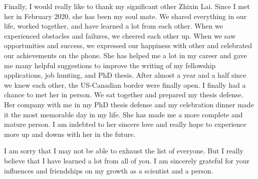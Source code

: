 Finally, I would really like to thank my significant other Zhixin Lai. Since I met her in February 2020, she has been my soul mate. We shared everything in our life, worked together, and have learned a lot from each other. When we experienced obstacles and failures, we cheered each other up. When we saw opportunities and success, we expressed our happiness with other and celebrated our achievements on the phone. She has helped me a lot in my career and gave me many helpful suggestions to improve the writing of my fellowship applications, job hunting, and PhD thesis. After almost a year and a half since we knew each other, the US-Canadian border were finally open. I finally had a chance to met her in person. We sat together and prepared my thesis defense. Her company with me in my PhD thesis defense and my celebration dinner made it the most memorable day in my life. She has made me a more complete and mature person. I am indebted to her sincere love and really hope to experience more up and downs with her in the future.



















I am sorry that I may not be able to exhaust the list of everyone. But I really believe that I have learned a lot from all of you. I am sincerely grateful for your influences and friendships on my growth as a scientist and a person. 

